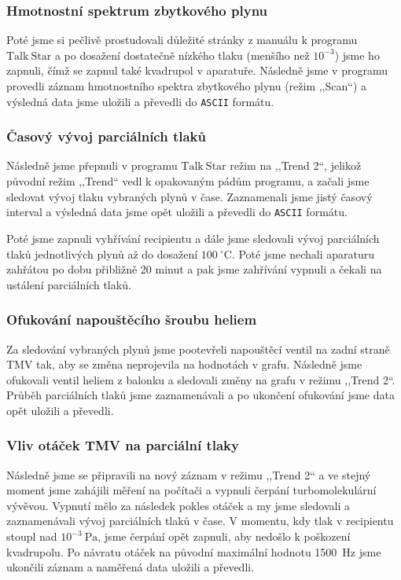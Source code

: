 \documentclass[english]{article}
\newcommand{\unit}[1]{~\mathrm{#1}}
\newcommand{\degc}{^\circ C}
\begin{document}
		\subsubsection{Hmotnostní spektrum zbytkového plynu}
			Poté jsme si pečlivě prostudovali důležité stránky z manuálu k programu $\mathrm{Talk~Star}$ a po dosažení dostatečně nízkého tlaku (menšího než $10^{-3}$) jsme ho zapnuli, čímž se zapnul také kvadrupol v aparatuře. Následně jsme v programu provedli záznam hmotnostního spektra zbytkového plynu (režim ,,Scan``) a výsledná data jsme uložili a převedli do \texttt{ASCII} formátu.
			
		\subsubsection{Časový vývoj parciálních tlaků}
			Následně jsme přepnuli v programu $\mathrm{Talk~Star}$ režim na ,,Trend 2``, jelikož původní režim ,,Trend`` vedl k opakovaným pádům programu, a začali jsme sledovat vývoj tlaku vybraných plynů v čase. Zaznamenali jsme jistý časový interval a výsledná data jsme opět uložili a převedli do \texttt{ASCII} formátu. 
			
			Poté jsme zapnuli vyhřívání recipientu a dále jsme sledovali vývoj parciálních tlaků jednotlivých plynů až do dosažení $100\unit{\degc}$. Poté jsme nechali aparaturu zahřátou po dobu přibližně 20 minut a pak jsme zahřívání vypnuli a čekali na ustálení parciálních tlaků. 
		
		\subsubsection{Ofukování napouštěcího šroubu heliem}
			Za sledování vybraných plynů jsme pootevřeli napouštěcí ventil na zadní straně TMV tak, aby se změna neprojevila na hodnotách v grafu. Následně jsme ofukovali ventil heliem z balonku a sledovali změny na grafu v režimu ,,Trend 2``. Průběh parciálních tlaků jsme zaznamenávali a po ukončení ofukování jsme data opět uložili a převedli.
			
		\subsubsection{Vliv otáček TMV na parciální tlaky}
			Následně jsme se připravili na nový záznam v režimu ,,Trend 2`` a ve stejný moment jsme zahájili měření na počítači a vypnuli čerpání turbomolekulární vývěvou. Vypnutí mělo za následek pokles otáček a my jsme sledovali a zaznamenávali vývoj parciálních tlaků v čase. V momentu, kdy tlak v recipientu stoupl nad $10^{-3}\unit{Pa}$, jsme čerpání opět zapnuli, aby nedošlo k poškození kvadrupolu. Po návratu otáček na původní maximální hodnotu 1500~Hz jsme ukončili záznam a naměřená data uložili a převedli.
			
\end{document}
